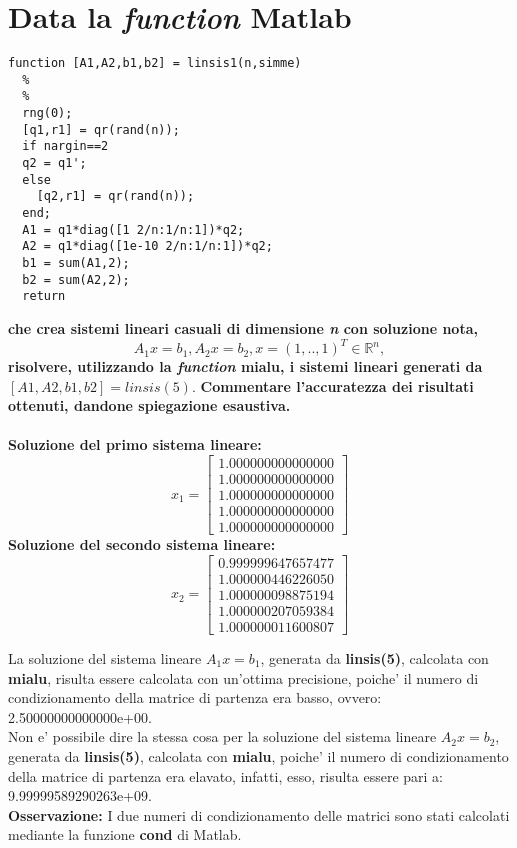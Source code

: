 \documentclass[10pt,a4paper]{article}
\begin{document}
\section{Data la \textit{function} Matlab}
\begin{lstlisting}[style=Matlab-editor]
  function [A1,A2,b1,b2] = linsis1(n,simme)
  %
  %
  rng(0);
  [q1,r1] = qr(rand(n));
  if nargin==2
  q2 = q1';
  else
    [q2,r1] = qr(rand(n));
  end;
  A1 = q1*diag([1 2/n:1/n:1])*q2;
  A2 = q1*diag([1e-10 2/n:1/n:1])*q2;
  b1 = sum(A1,2);
  b2 = sum(A2,2);
  return
\end{lstlisting}
\textbf{che crea sistemi lineari casuali di dimensione \textit{n} con soluzione nota,}
$$ A_1x = b_1, A_2x = b_2, x = (1,..,1)^T \in \mathbb{R}^{\textit{n}}, $$
\textbf{risolvere, utilizzando la \textit{function} \textbf{mialu}, i sistemi lineari generati da
  $ [A1,A2,b1,b2]=linsis(5)$}.
\textbf{Commentare l'accuratezza dei risultati ottenuti, dandone spiegazione esaustiva.}
\\\\
\textbf{Soluzione del primo sistema lineare:}
\[
  x_1 =
  \begin{bmatrix}
    1.000000000000000 \\
    1.000000000000000 \\
    1.000000000000000 \\
    1.000000000000000 \\
    1.000000000000000
  \end{bmatrix}
\]
\textbf{Soluzione del secondo sistema lineare:}
\[
  x_2 =
  \begin{bmatrix}
    0.999999647657477 \\
    1.000000446226050 \\
    1.000000098875194 \\
    1.000000207059384 \\
    1.000000011600807
  \end{bmatrix}
\]

La soluzione del sistema lineare $ A_1x = b_1 $, generata da \textbf{linsis(5)}, calcolata con \textbf{mialu},
risulta essere calcolata con un'ottima precisione, poiche' il numero di condizionamento della matrice
di partenza era basso, ovvero: 2.50000000000000e+00.
\\
Non e' possibile dire la stessa cosa per la soluzione del sistema lineare $ A_2x = b_2 $, generata da \textbf{linsis(5)},
calcolata con \textbf{mialu}, poiche' il numero di condizionamento della matrice di partenza era elavato, infatti,
esso, risulta essere pari a: 9.99999589290263e+09.
\\
\textbf{Osservazione:} I due numeri di condizionamento delle matrici sono stati calcolati mediante la funzione \textbf{cond} di Matlab.
\end{document}
